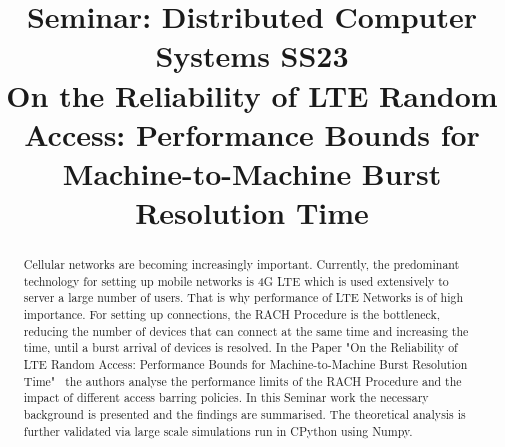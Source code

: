 \documentclass[conference]{IEEEtran}
\begin{document}
\title{Seminar: Distributed Computer Systems SS23\\
{\footnotesize On the Reliability of LTE Random Access: Performance Bounds for Machine-to-Machine Burst Resolution Time}}



\author{
}
\maketitle
\thispagestyle{plain}
\pagestyle{plain}
\begin{abstract}
    Cellular networks are becoming increasingly important.
    Currently, the predominant technology for setting up mobile networks is 4G LTE which is used extensively to server a large number of users.
    That is why performance of LTE Networks is of high importance.
    For setting up connections, the RACH Procedure is the bottleneck, reducing the number of devices that can connect at the same time and increasing the time, until a burst arrival of devices is resolved.
    In the Paper "On the Reliability of LTE Random Access: Performance Bounds for Machine-to-Machine Burst Resolution Time"~\cite{8422323} the authors analyse the performance limits of the RACH Procedure and the impact of different access barring policies.
    In this Seminar work the necessary background is presented and the findings are summarised.
    The theoretical analysis is further validated via large scale simulations run in CPython using Numpy.
\end{abstract}
\end{document}
